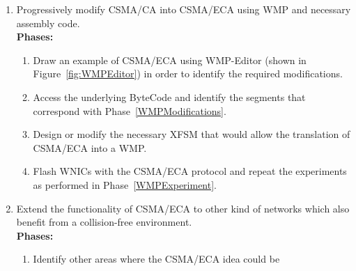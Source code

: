 \begin{enumerate}
	\item Progressively modify CSMA/CA into CSMA/ECA using WMP and necessary assembly code.\\
	
	{\bfseries Phases:}
	\begin{enumerate}
		\item Draw an example of CSMA/ECA using WMP-Editor (shown in Figure~\ref{fig:WMPEditor}) in order to identify the required modifications.\label{WMPModifications}
		\item Access the underlying ByteCode and identify the segments that correspond with Phase~\ref{WMPModifications}.
		\item Design or modify the necessary XFSM that would allow the translation of CSMA/ECA into a WMP.
		\item Flash WNICs with the CSMA/ECA protocol and repeat the experiments as performed in Phase~\ref{WMPExperiment}.\\
	\end{enumerate}

	\item Extend the functionality of CSMA/ECA to other kind of networks which also benefit from a collision-free environment.\\
	
	{\bfseries Phases:}
	\begin{enumerate}
		\item Identify other areas where the CSMA/ECA idea could be 
	\end{enumerate}

\end{enumerate}
